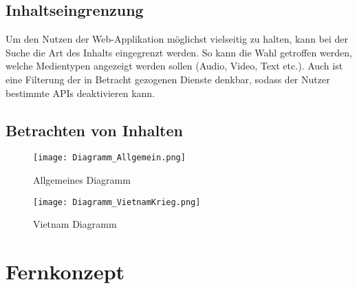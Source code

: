 \subsection{Inhaltseingrenzung}
Um den Nutzen der Web-Applikation möglichst vielseitig zu halten, kann bei der Suche die Art des Inhalts eingegrenzt werden. So kann die Wahl getroffen werden, welche Medientypen angezeigt werden sollen (Audio, Video, Text etc.). Auch ist eine Filterung der in Betracht gezogenen Dienste denkbar, sodass der Nutzer \bspw bestimmte APIs deaktivieren kann.

\subsection{Betrachten von Inhalten}



\begin{figure}[htb]
	\texttt{[image: Diagramm\_Allgemein.png]}
	\caption{Allgemeines Diagramm}
	\label{fig:diagrammAllgemein}
\end{figure}

\begin{figure}[htb]
	\texttt{[image: Diagramm\_VietnamKrieg.png]}
	\caption{Vietnam Diagramm}
	\label{fig:diagrammVietnam}
\end{figure}


\section{Fernkonzept}

